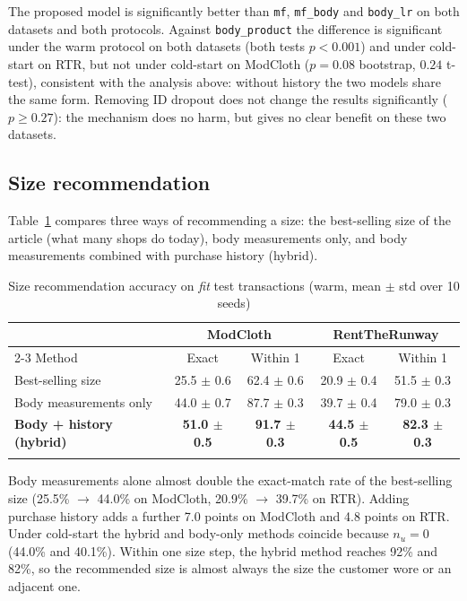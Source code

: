 The proposed model is significantly better than \texttt{mf}, \texttt{mf\_body} and \texttt{body\_lr} on both datasets and both protocols. Against \texttt{body\_product} the difference is significant under the warm protocol on both datasets (both tests $p < 0.001$) and under cold-start on RTR, but not under cold-start on ModCloth ($p = 0.08$ bootstrap, $0.24$ t-test), consistent with the analysis above: without history the two models share the same form. Removing ID dropout does not change the results significantly ($p \ge 0.27$): the mechanism does no harm, but gives no clear benefit on these two datasets.

\subsection{Size recommendation}
Table~\ref{tab:sizerec} compares three ways of recommending a size: the best-selling size of the article (what many shops do today), body measurements only, and body measurements combined with purchase history (hybrid).

\begin{table}[h]
\caption{Size recommendation accuracy on \emph{fit} test transactions (warm, mean $\pm$ std over 10 seeds)}\label{tab:sizerec}
\begin{tabular*}{\textwidth}{@{\extracolsep\fill}lcccc}
\toprule
 & \multicolumn{2}{c}{ModCloth} & \multicolumn{2}{c}{RentTheRunway} \\
\cmidrule{2-3}\cmidrule{4-5}
Method & Exact & Within 1 & Exact & Within 1 \\
\midrule
Best-selling size & 25.5 $\pm$ 0.6 & 62.4 $\pm$ 0.6 & 20.9 $\pm$ 0.4 & 51.5 $\pm$ 0.3 \\
Body measurements only & 44.0 $\pm$ 0.7 & 87.7 $\pm$ 0.3 & 39.7 $\pm$ 0.4 & 79.0 $\pm$ 0.3 \\
\textbf{Body + history (hybrid)} & \textbf{51.0 $\pm$ 0.5} & \textbf{91.7 $\pm$ 0.3} & \textbf{44.5 $\pm$ 0.5} & \textbf{82.3 $\pm$ 0.3} \\
\botrule
\end{tabular*}
\end{table}

Body measurements alone almost double the exact-match rate of the best-selling size (25.5\% $\rightarrow$ 44.0\% on ModCloth, 20.9\% $\rightarrow$ 39.7\% on RTR). Adding purchase history adds a further 7.0 points on ModCloth and 4.8 points on RTR. Under cold-start the hybrid and body-only methods coincide because $n_u = 0$ (44.0\% and 40.1\%). Within one size step, the hybrid method reaches 92\% and 82\%, so the recommended size is almost always the size the customer wore or an adjacent one.

